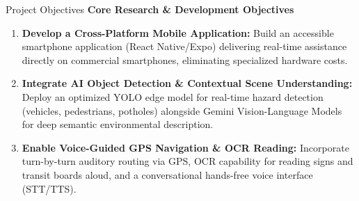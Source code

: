 \begin{frame}{Project Objectives}
{\large\textbf{\textcolor{MyUnivGreen}{Core Research \& Development Objectives}}}\\[8pt]

\begin{enumerate}
    \setlength\itemsep{8pt}
    \item \textbf{Develop a Cross-Platform Mobile Application:}
    Build an accessible smartphone application (React Native/Expo) delivering real-time assistance directly on commercial smartphones, eliminating specialized hardware costs.
    
    \item \textbf{Integrate AI Object Detection \& Contextual Scene Understanding:}
    Deploy an optimized YOLO edge model for real-time hazard detection (vehicles, pedestrians, potholes) alongside Gemini Vision-Language Models for deep semantic environmental description.
    
    \item \textbf{Enable Voice-Guided GPS Navigation \& OCR Reading:}
    Incorporate turn-by-turn auditory routing via GPS, OCR capability for reading signs and transit boards aloud, and a conversational hands-free voice interface (STT/TTS).
\end{enumerate}
\end{frame}